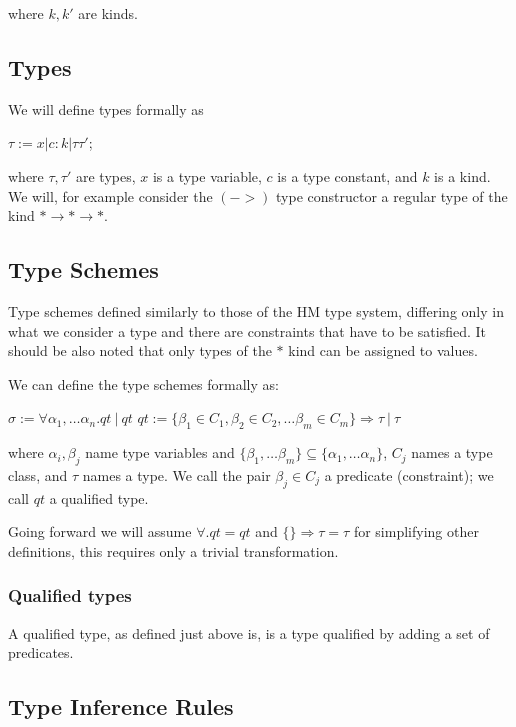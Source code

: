 where $k, k'$ are kinds.

\subsection{Types}

We will define types formally as

$\tau := x | c : k | \tau \tau'$;

where $\tau, \tau'$ are types, $x$ is a type variable, $c$ is a type constant, and $k$ is a kind. We will, for example consider the $(->)$ type constructor a regular type of the kind $* \rightarrow * \rightarrow *$.

\subsection{Type Schemes}

Type schemes defined similarly to those of the HM type system, differing only in what we consider a type and there are constraints that have to be satisfied. It should be also noted that only types of the $*$ kind can be assigned to values.

We can define the type schemes formally as:

$\sigma := \forall \alpha_1, \dots \alpha_n . qt\ |\ qt$
$qt := \{\beta_1 \in C_1, \beta_2 \in C_2, \dots \beta_m \in C_m\} \Rightarrow \tau\ |\ \tau$

where $\alpha_i, \beta_j$ name type variables and $\{\beta_1, \dots \beta_m\} \subseteq \{\alpha_1, \dots \alpha_n\}$, $C_j$ names a type class, and $\tau$ names a type. We call the pair $\beta_j \in C_j$ a predicate (constraint); we call $qt$ a qualified type.

Going forward we will assume $\forall . qt = qt$ and $\{\} \Rightarrow \tau = \tau$ for simplifying other definitions, this requires only a trivial transformation. %

\subsubsection{Qualified types}

A qualified type, as defined just above is, is a type qualified by adding a set of predicates.

\subsection{Type Inference Rules}

